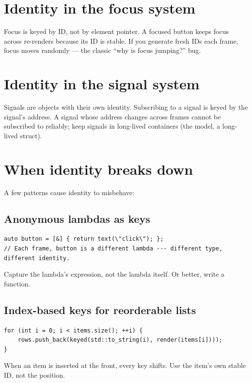 \section{Identity in the focus system}

Focus is keyed by ID, not by element pointer. A focused button
keeps focus across re-renders because its ID is stable. If you
generate fresh IDs each frame, focus moves randomly --- the
classic ``why is focus jumping?'' bug.

\section{Identity in the signal system}

Signals are objects with their own identity. Subscribing to a
signal is keyed by the signal's address. A signal whose address
changes across frames cannot be subscribed to reliably; keep
signals in long-lived containers (the model, a long-lived
struct).

\section{When identity breaks down}

A few patterns cause identity to misbehave:

\subsection*{Anonymous lambdas as keys}

\begin{lstlisting}
auto button = [&] { return text(\"click\"); };
// Each frame, button is a different lambda --- different type, different identity.
\end{lstlisting}

Capture the lambda's expression, not the lambda itself. Or
better, write a function.

\subsection*{Index-based keys for reorderable lists}

\begin{lstlisting}
for (int i = 0; i < items.size(); ++i) {
    rows.push_back(keyed(std::to_string(i), render(items[i])));
}
\end{lstlisting}

When an item is inserted at the front, every key shifts. Use the
item's own stable ID, not the position.

